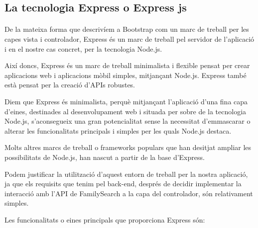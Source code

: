 \subsection{La tecnologia Express o Express js}

    \paragraph{}
    De la mateixa forma que descrivíem a Bootstrap com un marc de treball per les capes vista i controlador, Express és un marc de treball pel servidor de l'aplicació i en el nostre cas concret, per la tecnologia Node.js.

    Així doncs, Express és un marc de treball minimalista i flexible pensat per crear aplicacions web i aplicacions mòbil simples, mitjançant Node.js. Express també està pensat per la creació d'APIs robustes.

    Diem que Express és minimalista, perquè mitjançant l'aplicació d'una fina capa d'eines, destinades al desenvolupament web i situada per sobre de la tecnologia Node.js, s'aconsegueix una gran potencialitat sense la necessitat d'emmascarar o alterar les funcionalitats principals i simples per les quals Node.js destaca.

    Molts altres marcs de treball o frameworks populars que han desitjat ampliar les possibilitats de Node.js, han nascut a partir de la base d'Express.

    Podem justificar la utilització d'aquest entorn de treball per la nostra aplicació, ja que els  requisits que tenim pel back-end, després de decidir implementar la interacció amb l'API de FamilySearch a la capa del controlador,  són relativament simples.

    Les funcionalitats o eines principals que proporciona Express són:

